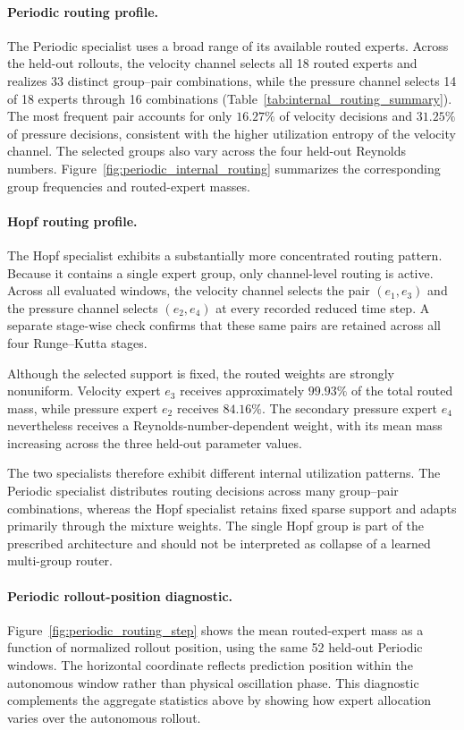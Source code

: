 \documentclass{article}
\begin{document}
\paragraph{Periodic routing profile.}
The Periodic specialist uses a broad range of its available routed experts. Across the held-out rollouts, the velocity channel selects all 18 routed experts and realizes 33 distinct group--pair combinations, while the pressure channel selects 14 of 18 experts through 16 combinations (Table~\ref{tab:internal_routing_summary}). The most frequent pair accounts for only $16.27\%$ of velocity decisions and $31.25\%$ of pressure decisions, consistent with the higher utilization entropy of the velocity channel. The selected groups also vary across the four held-out Reynolds numbers.
Figure~\ref{fig:periodic_internal_routing} summarizes the corresponding group frequencies and routed-expert masses.



\paragraph{Hopf routing profile.}
The Hopf specialist exhibits a substantially more concentrated routing pattern. Because it contains a single expert group, only channel-level routing is active. Across all evaluated windows, the velocity channel selects the pair
$(e_1,e_3)$ and the pressure channel selects $(e_2,e_4)$ at every recorded reduced time step. A separate stage-wise check confirms that these same pairs are retained across all four Runge--Kutta stages.

Although the selected support is fixed, the routed weights are strongly nonuniform. Velocity expert $e_3$ receives approximately $99.93\%$ of the total routed mass, while pressure expert $e_2$ receives $84.16\%$. The secondary pressure expert $e_4$ nevertheless receives a Reynolds-number-dependent weight, with its mean mass increasing across the three held-out parameter values.

The two specialists therefore exhibit different internal utilization patterns. The Periodic specialist distributes routing decisions across many group--pair combinations, whereas the Hopf specialist retains fixed sparse support and adapts primarily through the mixture weights. The single Hopf group is part of the prescribed architecture and should not be interpreted as collapse of a learned multi-group router.

\paragraph{Periodic rollout-position diagnostic.}
Figure~\ref{fig:periodic_routing_step} shows the mean routed-expert mass as a function of normalized rollout position, using the same 52 held-out Periodic windows. The horizontal coordinate reflects prediction position within the
autonomous window rather than physical oscillation phase. This diagnostic complements the aggregate statistics above by showing how expert allocation varies over the autonomous rollout.
\end{document}
